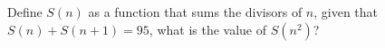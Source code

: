 Define $S(n)$ as a function that sums the divisors of $n$, given that $S(n)+S(n+1) = 95$, what is the value of $S(n^2)$?
